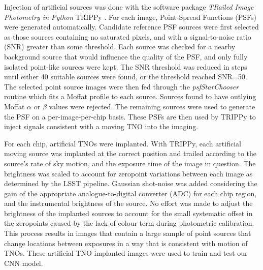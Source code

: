 Injection of artificial sources was done with the software package \emph{TRailed Image Photometry in Python} TRIPPy \citep{2016AJ....151..158F}. 
For each image, Point-Spread Functions (PSFs) were generated automatically. 
Candidate reference PSF sources were first selected as those sources containing no saturated pixels, and with a signal-to-noise  ratio (SNR) greater than some threshold. 
Each source was checked for a nearby background source that would influence the quality of the PSF, and only fully isolated point-like sources were kept. 
The SNR threshold was reduced in steps until either 40 suitable sources were found, or the threshold reached SNR=50. 
The selected point source images were then fed through the \emph{psfStarChooser} routine which fits a Moffat profile to each source. 
Sources found to have outlying Moffat $\alpha$ or $\beta$ values were rejected. 
The remaining sources were used to generate the PSF on a per-image-per-chip basis. These PSFs are then used by TRIPPy to inject signals consistent with a moving TNO into the imaging.

For each chip, artificial TNOs were implanted. 
With TRIPPy, each artificial moving source was implanted at the correct position and trailed according to the source's rate of sky motion, and the exposure time of the image in question. 
The brightness was scaled to account for zeropoint variations between each image as determined by the LSST pipeline. 
Gaussian shot-noise was added considering the gain of the appropriate analogue-to-digital converter (ADC) for each chip region, and the instrumental brightness of the source. 
No effort was made to adjust the brightness of the implanted sources to account for the small systematic offset in the zeropoints caused by the lack of colour term during photometric calibration. 
This process results in images that contain a large sample of point sources that change locations between exposures in a way that is consistent with motion of TNOs.
These artificial TNO implanted images were used to train and test our CNN model.

